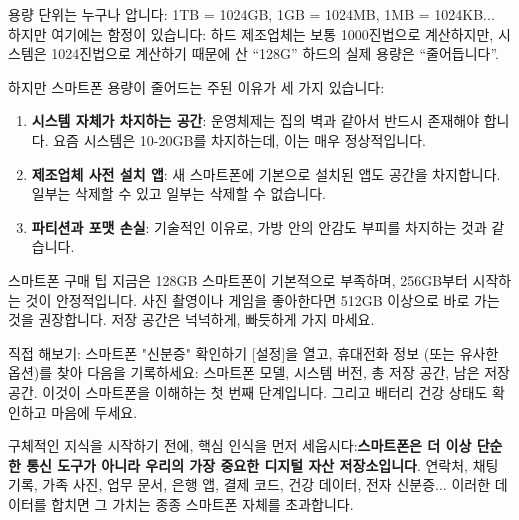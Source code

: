 용량 단위는 누구나 압니다: 1TB = 1024GB, 1GB = 1024MB, 1MB = 1024KB... 하지만 여기에는 함정이 있습니다: 하드 제조업체는 보통 1000진법으로 계산하지만, 시스템은 1024진법으로 계산하기 때문에 산 “128G” 하드의 실제 용량은 “줄어듭니다”.

하지만 스마트폰 용량이 줄어드는 주된 이유가 세 가지 있습니다:

\begin{enumerate}
  \item \textbf{시스템 자체가 차지하는 공간}: 운영체제는 집의 벽과 같아서 반드시 존재해야 합니다. 요즘 시스템은 10-20GB를 차지하는데, 이는 매우 정상적입니다.
  \item \textbf{제조업체 사전 설치 앱}: 새 스마트폰에 기본으로 설치된 앱도 공간을 차지합니다. 일부는 삭제할 수 있고 일부는 삭제할 수 없습니다.
  \item \textbf{파티션과 포맷 손실}: 기술적인 이유로, 가방 안의 안감도 부피를 차지하는 것과 같습니다.
\end{enumerate}

\begin{tcbinfo}{스마트폰 구매 팁}
지금은 128GB 스마트폰이 기본적으로 부족하며, 256GB부터 시작하는 것이 안정적입니다. 사진 촬영이나 게임을 좋아한다면 512GB 이상으로 바로 가는 것을 권장합니다. 저장 공간은 넉넉하게, 빠듯하게 가지 마세요.

\end{tcbinfo}

\begin{tcbpractice}{직접 해보기: 스마트폰 "신분증" 확인하기}
[설정]을 열고, 휴대전화 정보 (또는 유사한 옵션)를 찾아 다음을 기록하세요: 스마트폰 모델, 시스템 버전, 총 저장 공간, 남은 저장 공간. 이것이 스마트폰을 이해하는 첫 번째 단계입니다. 그리고 배터리 건강 상태도 확인하고 마음에 두세요.

\end{tcbpractice}


구체적인 지식을 시작하기 전에, 핵심 인식을 먼저 세웁시다:\textbf{스마트폰은 더 이상 단순한 통신 도구가 아니라 우리의 가장 중요한 디지털 자산 저장소입니다}. 연락처, 채팅 기록, 가족 사진, 업무 문서, 은행 앱, 결제 코드, 건강 데이터, 전자 신분증... 이러한 데이터를 합치면 그 가치는 종종 스마트폰 자체를 초과합니다.

